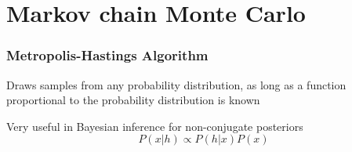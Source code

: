 \section{Markov chain Monte Carlo}

\begin{frame}
  \frametitle{Metropolis-Hastings Algorithm}
  \begin{center}
    Draws samples from any probability distribution, as long as a function
    proportional to the probability distribution is known
    \vspace{4em}

    Very useful in Bayesian inference for non-conjugate posteriors
    \[P(x|h) \propto P(h|x) P(x)\]
  \end{center}
\end{frame}
